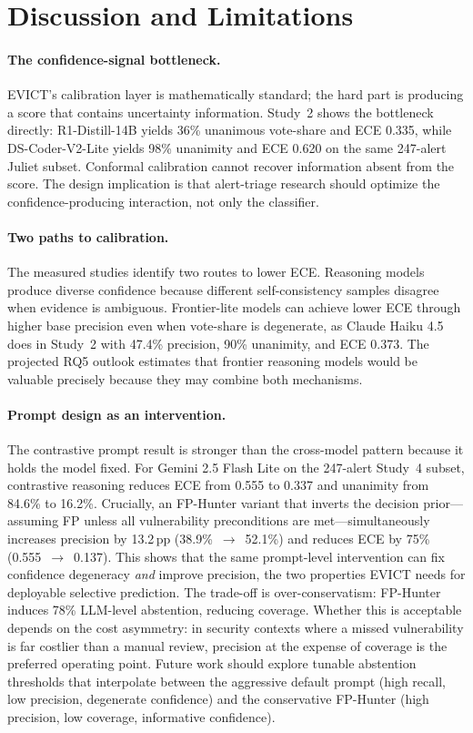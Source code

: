 \section{Discussion and Limitations}
\label{sec:discussion}

\paragraph{The confidence-signal bottleneck.}
EVICT's calibration layer is mathematically standard; the hard part is producing a score that contains uncertainty information. Study~2 shows the bottleneck directly: R1-Distill-14B yields 36\% unanimous vote-share and ECE 0.335, while DS-Coder-V2-Lite yields 98\% unanimity and ECE 0.620 on the same 247-alert Juliet subset. Conformal calibration cannot recover information absent from the score. The design implication is that alert-triage research should optimize the confidence-producing interaction, not only the classifier.

\paragraph{Two paths to calibration.}
The measured studies identify two routes to lower ECE. Reasoning models produce diverse confidence because different self-consistency samples disagree when evidence is ambiguous. Frontier-lite models can achieve lower ECE through higher base precision even when vote-share is degenerate, as Claude Haiku 4.5 does in Study~2 with 47.4\% precision, 90\% unanimity, and ECE 0.373. The projected RQ5 outlook estimates that frontier reasoning models would be valuable precisely because they may combine both mechanisms.

\paragraph{Prompt design as an intervention.}
The contrastive prompt result is stronger than the cross-model pattern because it holds the model fixed. For Gemini 2.5 Flash Lite on the 247-alert Study~4 subset, contrastive reasoning reduces ECE from 0.555 to 0.337 and unanimity from 84.6\% to 16.2\%. Crucially, an FP-Hunter variant that inverts the decision prior---assuming FP unless all vulnerability preconditions are met---simultaneously increases precision by 13.2\,pp (38.9\%~$\to$~52.1\%) and reduces ECE by 75\% (0.555~$\to$~0.137). This shows that the same prompt-level intervention can fix confidence degeneracy \emph{and} improve precision, the two properties EVICT needs for deployable selective prediction. The trade-off is over-conservatism: FP-Hunter induces 78\% LLM-level abstention, reducing coverage. Whether this is acceptable depends on the cost asymmetry: in security contexts where a missed vulnerability is far costlier than a manual review, precision at the expense of coverage is the preferred operating point. Future work should explore tunable abstention thresholds that interpolate between the aggressive default prompt (high recall, low precision, degenerate confidence) and the conservative FP-Hunter (high precision, low coverage, informative confidence).

